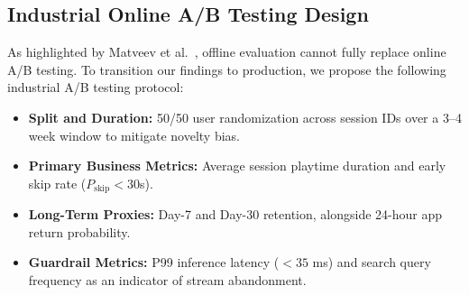 \subsection{Industrial Online A/B Testing Design}
As highlighted by Matveev et al.~\cite{matveev2026session}, offline evaluation cannot fully replace online A/B testing. To transition our findings to production, we propose the following industrial A/B testing protocol:
\begin{itemize}
    \item \textbf{Split and Duration:} 50/50 user randomization across session IDs over a 3--4 week window to mitigate novelty bias.
    \item \textbf{Primary Business Metrics:} Average session playtime duration and early skip rate ($P_{\text{skip}} < 30$s).
    \item \textbf{Long-Term Proxies:} Day-7 and Day-30 retention, alongside 24-hour app return probability.
    \item \textbf{Guardrail Metrics:} P99 inference latency ($<35$ ms) and search query frequency as an indicator of stream abandonment.
\end{itemize}
